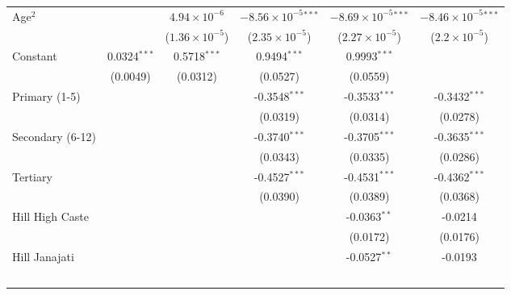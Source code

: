 \begin{tabular}{lccccc}
   Age$^2$                           &                 & $4.94\times 10^{-6}$    & $-8.56\times 10^{-5}$$^{***}$  & $-8.69\times 10^{-5}$$^{***}$  & $-8.46\times 10^{-5}$$^{***}$\\    
                                     &                 & ($1.36\times 10^{-5}$)  & ($2.35\times 10^{-5}$)         & ($2.27\times 10^{-5}$)         & ($2.2\times 10^{-5}$)\\    
   Constant                          & 0.0324$^{***}$  & 0.5718$^{***}$          & 0.9494$^{***}$                 & 0.9993$^{***}$                 &   \\   
                                     & (0.0049)        & (0.0312)                & (0.0527)                       & (0.0559)                       &   \\   
   Primary (1-5)                     &                 &                         & -0.3548$^{***}$                & -0.3533$^{***}$                & -0.3432$^{***}$\\   
                                     &                 &                         & (0.0319)                       & (0.0314)                       & (0.0278)\\   
   Secondary (6-12)                  &                 &                         & -0.3740$^{***}$                & -0.3705$^{***}$                & -0.3635$^{***}$\\   
                                     &                 &                         & (0.0343)                       & (0.0335)                       & (0.0286)\\   
   Tertiary                          &                 &                         & -0.4527$^{***}$                & -0.4531$^{***}$                & -0.4362$^{***}$\\   
                                     &                 &                         & (0.0390)                       & (0.0389)                       & (0.0368)\\   
   Hill High Caste                   &                 &                         &                                & -0.0363$^{**}$                 & -0.0214\\   
                                     &                 &                         &                                & (0.0172)                       & (0.0176)\\   
   Hill Janajati                     &                 &                         &                                & -0.0527$^{**}$                 & -0.0193\\   
$$
\end{tabular}
